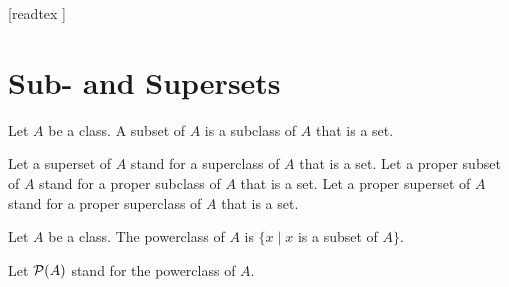 \documentclass[10pt]{article}
\begin{document}
  \begin{imports}
    \begin{forthel}
      [readtex ]
    \end{forthel}
  \end{imports}


  \section*{Sub- and Supersets}

  \begin{forthel}
    \begin{definition}[id=FOUNDATIONS_10_1346889551183872,printid]
      Let $A$ be a class.
      A subset of $A$ is a subclass of $A$ that is a set.
    \end{definition}

    Let a superset of $A$ stand for a superclass of $A$ that is a set.
    Let a proper subset of $A$ stand for a proper subclass of $A$ that is a set.
    Let a proper superset of $A$ stand for a proper superclass of $A$ that is a set.
  \end{forthel}

  \begin{forthel}
    \begin{definition}[id=FOUNDATIONS_10_1448589907722240,printid]
      Let $A$ be a class.
      The powerclass of $A$ is $\{ x \mid x$ is a subset of $A \}$.
    \end{definition}

    Let $\mathcal{P}(A)$ stand for the powerclass of $A$.
  \end{forthel}
\end{document}
